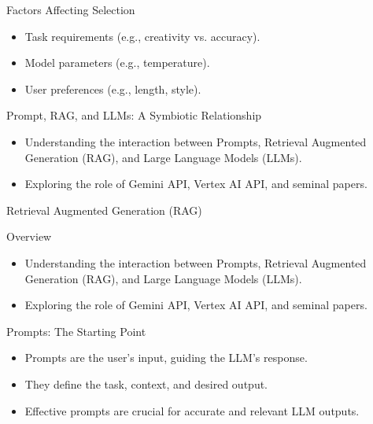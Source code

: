 \begin{frame}{Factors Affecting Selection}
  \begin{itemize}
    \item Task requirements (e.g., creativity vs. accuracy).
    \item Model parameters (e.g., temperature).
    \item User preferences (e.g., length, style).
  \end{itemize}
\end{frame}


\begin{frame}{Prompt, RAG, and LLMs: A Symbiotic Relationship}
  \begin{itemize}
    \item Understanding the interaction between Prompts, Retrieval Augmented Generation (RAG), and Large Language Models (LLMs).
    \item Exploring the role of Gemini API, Vertex AI API, and seminal papers.
  \end{itemize}
\end{frame}

\begin{frame}
\Huge
\centering
Retrieval Augmented Generation (RAG)
\end{frame}



\begin{frame}{Overview}
  \begin{itemize}
    \item Understanding the interaction between Prompts, Retrieval Augmented Generation (RAG), and Large Language Models (LLMs).
    \item Exploring the role of Gemini API, Vertex AI API, and seminal papers.
  \end{itemize}
\end{frame}

\begin{frame}{Prompts: The Starting Point}
  \begin{itemize}
    \item Prompts are the user's input, guiding the LLM's response.
    \item They define the task, context, and desired output.
    \item Effective prompts are crucial for accurate and relevant LLM outputs.
  \end{itemize}
\end{frame}

